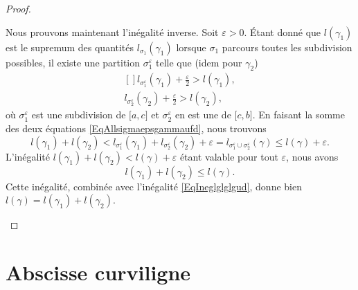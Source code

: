 \begin{proof}
\begin{enumerate}
            Nous prouvons maintenant l'inégalité inverse. Soit $\varepsilon>0$. Étant donné que $l(\gamma_1)$ est le supremum des quantités $l_{\sigma_1}(\gamma_1)$ lorsque $\sigma_1$ parcours toutes les subdivision possibles, il existe une partition $\sigma_1^{\varepsilon}$ telle que (idem pour $\gamma_2$)
            \begin{equation}        \label{EqAllsigmaepsgammaufd}
                \begin{aligned}[]
                    l_{\sigma_1^{\varepsilon}}(\gamma_1)+\frac{ \varepsilon }{2}>l(\gamma_1),\\
                    l_{\sigma_2^{\varepsilon}}(\gamma_2)+\frac{ \varepsilon }{2}>l(\gamma_2),
                \end{aligned}
            \end{equation}
            où $\sigma_1^{\varepsilon}$ est une subdivision de $\mathopen[ a , c \mathclose]$ et $\sigma_2^{\varepsilon}$ en est une de $\mathopen[ c , b \mathclose]$. En faisant la somme des deux équations \eqref{EqAllsigmaepsgammaufd}, nous trouvons
            \begin{equation}
                l(\gamma_1)+l(\gamma_2)<l_{\sigma_1^{\varepsilon}}(\gamma_1)+l_{\sigma_2^{\varepsilon}}(\gamma_2)+\varepsilon=l_{\sigma_1^{\varepsilon}\cup\sigma_2^{\varepsilon}}(\gamma)\leq l(\gamma)+\varepsilon.
            \end{equation}
            L'inégalité $l(\gamma_1)+l(\gamma_2)<l(\gamma)+\varepsilon$ étant valable pour tout $\varepsilon$, nous avons
            \begin{equation}
                l(\gamma_1)+l(\gamma_2)\leq l(\gamma).
            \end{equation}
            Cette inégalité, combinée avec l'inégalité \eqref{EqIneglglglgud}, donne bien $l(\gamma)=l(\gamma_1)+l(\gamma_2)$.
    \end{enumerate}
\end{proof}

\section{Abscisse curviligne}

